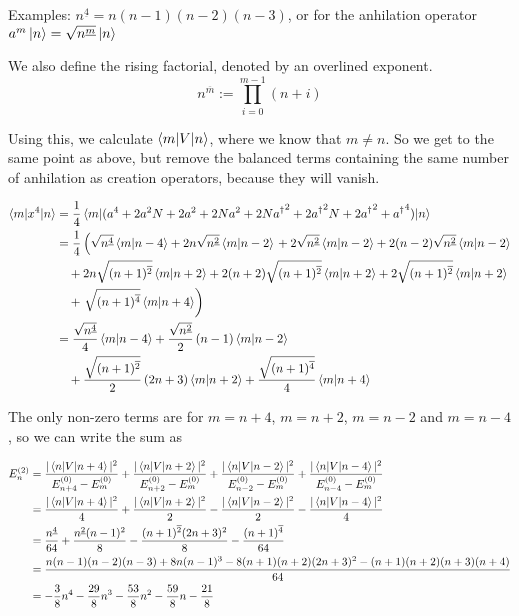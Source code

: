 \documentclass[a4paper,german,12pt,smallheadings]{scrartcl}
\begin{document}
\begin{enumerate}[a)]
    Examples: $n^{\underline{4}} = n (n-1) (n-2) (n-3)$, or for the anhilation
    operator $a^m \ket{n} = \sqrt{n^{\underline{m}}} \ket{n}$

    We also define the rising factorial, denoted by an overlined exponent.
    \begin{equation*}
      n^{\overline{m}} := \prod_{i=0}^{m-1} (n+i)
    \end{equation*}

    Using this, we calculate $\braket{m|V|n}$, where we know that $m \neq n$.
    So we get to the same point as above, but remove the balanced terms
    containing the same number of anhilation as creation operators, because
    they will vanish.

    \begin{align*}
      \braket{m|x^4|n} &= \frac{1}{4} \braket{m|(a^4 + 2a^2N + 2a^2 + 2Na^2 + 2N{a^\dagger}^2 + 2{a^\dagger}^2 N + 2{a^\dagger}^2 + {a^\dagger}^4)|n} \\
                                   &= \frac{1}{4} \left(\sqrt{n^{\underline{4}}} \braket{m|n-4} + 2 n \sqrt{n^{\underline{2}}} \braket{m|n-2} \right.
      + 2 \sqrt{n^{\underline{2}}} \braket{m|n-2} + 2 (n-2) \sqrt{n^{\underline{2}}} \braket{m|n-2} \\
    & \quad + 2n \sqrt{(n+1)^{\overline 2}} \braket{m|n+2}+ 2(n+2) \sqrt{(n+1)^{\overline 2}} \braket{m|n+2} + 2 \sqrt{(n+1)^{\overline 2}} \braket{m|n+2} \\
    &\quad + \left. \sqrt{(n+1)^{\overline 4}} \braket{m|n+4} \right) \\
    &=  \frac{\sqrt{n^{\underline 4}}}{4}            \braket{m|n-4}
      + \frac{\sqrt{n^{\underline 2}}}{2} \del{n-1}  \braket{m|n-2} \\
      &\quad+ \frac{\sqrt{(n+1)^{\overline  2}}}{2} \del{2n+3} \braket{m|n+2}
      + \frac{\sqrt{(n+1)^{\overline  4}}}{4}            \braket{m|n+4}
    \end{align*}

    The only non-zero terms are for $m=n+4$, $m=n+2$, $m=n-2$ and $m=n-4$, so
    we can write the sum as

    \begin{align*}
      E_n^{(2)} &=
      \frac{|\braket{n|V|n+4}|^2}{E^{(0)}_{n+4} - E^{(0)}_{m}} +
      \frac{|\braket{n|V|n+2}|^2}{E^{(0)}_{n+2} - E^{(0)}_{m}} +
      \frac{|\braket{n|V|n-2}|^2}{E^{(0)}_{n-2} - E^{(0)}_{m}} +
      \frac{|\braket{n|V|n-4}|^2}{E^{(0)}_{n-4} - E^{(0)}_{m}} \\
      &=
      \frac{|\braket{n|V|n+4}|^2}{4} +
      \frac{|\braket{n|V|n+2}|^2}{2}
      -\frac{|\braket{n|V|n-2}|^2}{2}
      -\frac{|\braket{n|V|n-4}|^2}{4} \\
      &=
      \frac{n^{\underline 4}}{64}
      +\frac{n^{\underline 2}(n-1)^2}{8}
      -\frac{(n+1)^{\overline 2}(2n+3)^2}{8}
      -\frac{(n+1)^{\overline 4}}{64} \\
      &=
      \frac{n(n-1)(n-2)(n-3) + 8 n(n-1)^3 - 8(n+1)(n+2)(2n+3)^2 - (n+1)(n+2)(n+3)(n+4)}{64} \\
      &= -\frac{3}{8}n^4 - \frac{29}{8}n^3 - \frac{53}{8}n^2 - \frac{59}{8} n - \frac{21}{8}
    \end{align*}


\end{enumerate}
\end{document}
